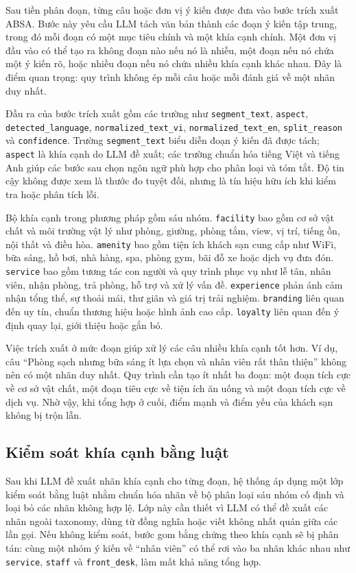 \documentclass[12pt,a4paper]{report}
\begin{document}
Sau tiền phân đoạn, từng câu hoặc đơn vị ý kiến được đưa vào bước trích xuất ABSA. Bước này yêu cầu LLM tách văn bản thành các đoạn ý kiến tập trung, trong đó mỗi đoạn có một mục tiêu chính và một khía cạnh chính. Một đơn vị đầu vào có thể tạo ra không đoạn nào nếu nó là nhiễu, một đoạn nếu nó chứa một ý kiến rõ, hoặc nhiều đoạn nếu nó chứa nhiều khía cạnh khác nhau. Đây là điểm quan trọng: quy trình không ép mỗi câu hoặc mỗi đánh giá về một nhãn duy nhất.

Đầu ra của bước trích xuất gồm các trường như \texttt{segment\_text}, \texttt{aspect}, \texttt{detected\_language}, \texttt{normalized\_text\_vi}, \texttt{normalized\_text\_en}, \texttt{split\_reason} và \texttt{confidence}. Trường \texttt{segment\_text} biểu diễn đoạn ý kiến đã được tách; \texttt{aspect} là khía cạnh do LLM đề xuất; các trường chuẩn hóa tiếng Việt và tiếng Anh giúp các bước sau chọn ngôn ngữ phù hợp cho phân loại và tóm tắt. Độ tin cậy không được xem là thước đo tuyệt đối, nhưng là tín hiệu hữu ích khi kiểm tra hoặc phân tích lỗi.

Bộ khía cạnh trong phương pháp gồm sáu nhóm. \texttt{facility} bao gồm cơ sở vật chất và môi trường vật lý như phòng, giường, phòng tắm, view, vị trí, tiếng ồn, nội thất và điều hòa. \texttt{amenity} bao gồm tiện ích khách sạn cung cấp như WiFi, bữa sáng, hồ bơi, nhà hàng, spa, phòng gym, bãi đỗ xe hoặc dịch vụ đưa đón. \texttt{service} bao gồm tương tác con người và quy trình phục vụ như lễ tân, nhân viên, nhận phòng, trả phòng, hỗ trợ và xử lý vấn đề. \texttt{experience} phản ánh cảm nhận tổng thể, sự thoải mái, thư giãn và giá trị trải nghiệm. \texttt{branding} liên quan đến uy tín, chuẩn thương hiệu hoặc hình ảnh cao cấp. \texttt{loyalty} liên quan đến ý định quay lại, giới thiệu hoặc gắn bó.

Việc trích xuất ở mức đoạn giúp xử lý các câu nhiều khía cạnh tốt hơn. Ví dụ, câu ``Phòng sạch nhưng bữa sáng ít lựa chọn và nhân viên rất thân thiện'' không nên có một nhãn duy nhất. Quy trình cần tạo ít nhất ba đoạn: một đoạn tích cực về cơ sở vật chất, một đoạn tiêu cực về tiện ích ăn uống và một đoạn tích cực về dịch vụ. Nhờ vậy, khi tổng hợp ở cuối, điểm mạnh và điểm yếu của khách sạn không bị trộn lẫn.

\subsection{Kiểm soát khía cạnh bằng luật}

Sau khi LLM đề xuất nhãn khía cạnh cho từng đoạn, hệ thống áp dụng một lớp kiểm soát bằng luật nhằm chuẩn hóa nhãn về bộ phân loại sáu nhóm cố định và loại bỏ các nhãn không hợp lệ. Lớp này cần thiết vì LLM có thể đề xuất các nhãn ngoài taxonomy, dùng từ đồng nghĩa hoặc viết không nhất quán giữa các lần gọi. Nếu không kiểm soát, bước gom bằng chứng theo khía cạnh sẽ bị phân tán: cùng một nhóm ý kiến về ``nhân viên'' có thể rơi vào ba nhãn khác nhau như \texttt{service}, \texttt{staff} và \texttt{front\_desk}, làm mất khả năng tổng hợp.
\end{document}
